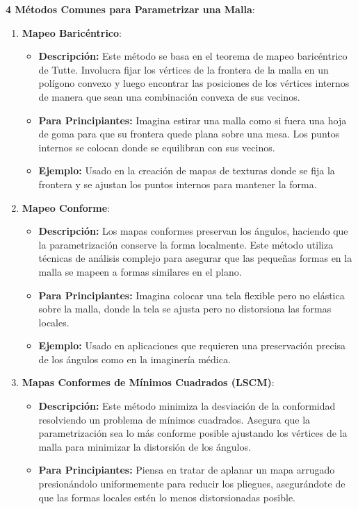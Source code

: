 \documentclass{article}
\begin{document}
\textbf{4 Métodos Comunes para Parametrizar una Malla}:

\begin{enumerate}
    \item \textbf{Mapeo Baricéntrico}:
    \begin{itemize}
        \item \textbf{Descripción:} Este método se basa en el teorema de mapeo baricéntrico de Tutte. Involucra fijar los vértices de la frontera de la malla en un polígono convexo y luego encontrar las posiciones de los vértices internos de manera que sean una combinación convexa de sus vecinos.
        \item \textbf{Para Principiantes:} Imagina estirar una malla como si fuera una hoja de goma para que su frontera quede plana sobre una mesa. Los puntos internos se colocan donde se equilibran con sus vecinos.
        \item \textbf{Ejemplo:} Usado en la creación de mapas de texturas donde se fija la frontera y se ajustan los puntos internos para mantener la forma.
    \end{itemize}
    \item \textbf{Mapeo Conforme}:
    \begin{itemize}
        \item \textbf{Descripción:} Los mapas conformes preservan los ángulos, haciendo que la parametrización conserve la forma localmente. Este método utiliza técnicas de análisis complejo para asegurar que las pequeñas formas en la malla se mapeen a formas similares en el plano.
        \item \textbf{Para Principiantes:} Imagina colocar una tela flexible pero no elástica sobre la malla, donde la tela se ajusta pero no distorsiona las formas locales.
        \item \textbf{Ejemplo:} Usado en aplicaciones que requieren una preservación precisa de los ángulos como en la imaginería médica.
    \end{itemize}
    \item \textbf{Mapas Conformes de Mínimos Cuadrados (LSCM)}:
    \begin{itemize}
        \item \textbf{Descripción:} Este método minimiza la desviación de la conformidad resolviendo un problema de mínimos cuadrados. Asegura que la parametrización sea lo más conforme posible ajustando los vértices de la malla para minimizar la distorsión de los ángulos.
        \item \textbf{Para Principiantes:} Piensa en tratar de aplanar un mapa arrugado presionándolo uniformemente para reducir los pliegues, asegurándote de que las formas locales estén lo menos distorsionadas posible.

\end{itemize}
\end{enumerate}
\end{document}
